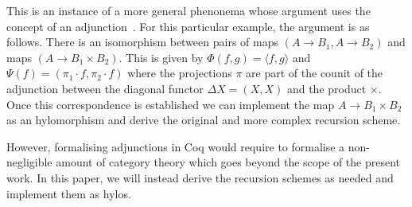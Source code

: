 \documentclass[a4paper, UKenglish, cleveref, autoref, thm-restate]{lipics-v2021}
\newcommand{\N}{\mathbb{N}}
\newcommand{\Nat}{\N}
\newcommand{\R}{\mathbb{R}}
\newcommand{\comp}{\cdot}
\newcommand{\operator}[1]{\textsf{#1}}
\newcommand{\pair}[2]{\langle #1, #2 \rangle}
\begin{document}
This is an instance of a more general phenonema whose argument uses the concept
of an adjunction~\cite{MacLane71}.  For this particular example, the argument is
as follows.  There is an isomorphism between pairs of maps
$(A \to B_{1}, A \to B_{2})$ and maps $(A \to B_{1} \times B_{2})$.  This is
given by $\Phi (f,g) = \pair{f}{g}$ and
$\Psi(f) = (\pi_{1} \comp f, \pi_{2} \comp f)$ where the projections $\pi$ are
part of the counit of the adjunction between the diagonal functor
$\Delta X = (X,X)$ and the product $\times$.  Once this correspondence is
established we can implement the map $A \to B_{1} \times B_{2}$ as an
hylomorphism and derive the original and more complex recursion scheme.


However, formalising adjunctions in Coq would require to formalise a
non-negligible amount of category theory which goes beyond the scope of the
present work. In this paper, we will instead derive the recursion schemes as
needed and implement them as hylos.
\end{document}
